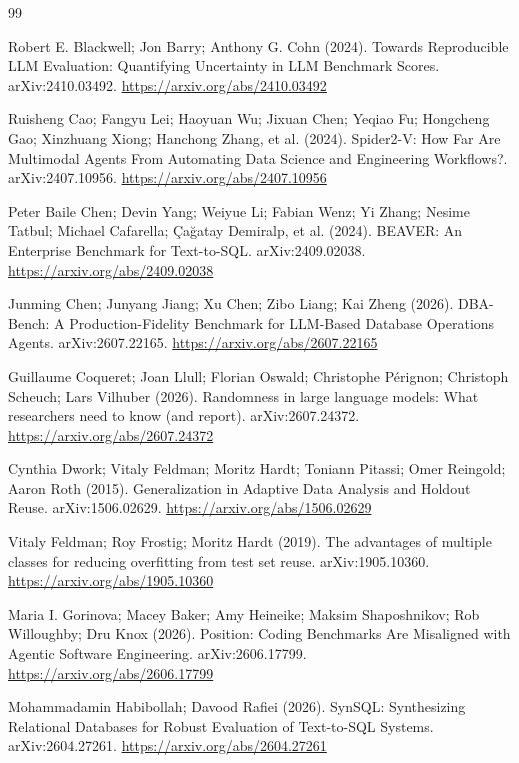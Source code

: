 \begin{thebibliography}{99}

 Robert E. Blackwell; Jon Barry; Anthony G. Cohn (2024). Towards Reproducible LLM Evaluation: Quantifying Uncertainty in LLM Benchmark Scores. arXiv:2410.03492. \url{https://arxiv.org/abs/2410.03492}

 Ruisheng Cao; Fangyu Lei; Haoyuan Wu; Jixuan Chen; Yeqiao Fu; Hongcheng Gao; Xinzhuang Xiong; Hanchong Zhang, et al. (2024). Spider2-V: How Far Are Multimodal Agents From Automating Data Science and Engineering Workflows?. arXiv:2407.10956. \url{https://arxiv.org/abs/2407.10956}

 Peter Baile Chen; Devin Yang; Weiyue Li; Fabian Wenz; Yi Zhang; Nesime Tatbul; Michael Cafarella; Çağatay Demiralp, et al. (2024). BEAVER: An Enterprise Benchmark for Text-to-SQL. arXiv:2409.02038. \url{https://arxiv.org/abs/2409.02038}

 Junming Chen; Junyang Jiang; Xu Chen; Zibo Liang; Kai Zheng (2026). DBA-Bench: A Production-Fidelity Benchmark for LLM-Based Database Operations Agents. arXiv:2607.22165. \url{https://arxiv.org/abs/2607.22165}

 Guillaume Coqueret; Joan Llull; Florian Oswald; Christophe Pérignon; Christoph Scheuch; Lars Vilhuber (2026). Randomness in large language models: What researchers need to know (and report). arXiv:2607.24372. \url{https://arxiv.org/abs/2607.24372}

 Cynthia Dwork; Vitaly Feldman; Moritz Hardt; Toniann Pitassi; Omer Reingold; Aaron Roth (2015). Generalization in Adaptive Data Analysis and Holdout Reuse. arXiv:1506.02629. \url{https://arxiv.org/abs/1506.02629}

 Vitaly Feldman; Roy Frostig; Moritz Hardt (2019). The advantages of multiple classes for reducing overfitting from test set reuse. arXiv:1905.10360. \url{https://arxiv.org/abs/1905.10360}

 Maria I. Gorinova; Macey Baker; Amy Heineike; Maksim Shaposhnikov; Rob Willoughby; Dru Knox (2026). Position: Coding Benchmarks Are Misaligned with Agentic Software Engineering. arXiv:2606.17799. \url{https://arxiv.org/abs/2606.17799}

 Mohammadamin Habibollah; Davood Rafiei (2026). SynSQL: Synthesizing Relational Databases for Robust Evaluation of Text-to-SQL Systems. arXiv:2604.27261. \url{https://arxiv.org/abs/2604.27261}


\end{thebibliography}
